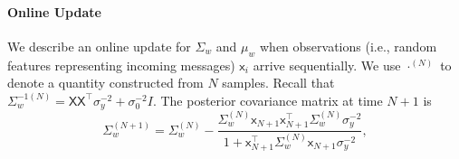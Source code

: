 \documentclass[english]{article}
\theoremstyle{plain}
\theoremstyle{plain}
\begin{document}
 
\paragraph{Online Update}
We describe an online update for $\Sigma_{w}$ and
$\mu_{w}$ when observations (i.e., random features representing incoming 
messages) $\mathsf{x}_i$ arrive sequentially. We use $\cdot^{(N)}$
to denote a quantity constructed from $N$ samples. Recall that $\Sigma_{w}^{-1(N)}= \mathsf{X} \mathsf{X}^{\top}\sigma_{y}^{-2}+\sigma_{0}^{-2}I$.
The posterior covariance matrix at time $N+1$ is
\begin{equation}
\Sigma_{w}^{(N+1)} 
 =
\Sigma_{w}^{(N)}-\frac{\Sigma_{w}^{(N)} \mathsf{x}_{N+1} \mathsf{x}_{N+1}^{\top} \Sigma_{w}^{(N)}\sigma_{y}^{-2}}{1+ \mathsf{x}_{N+1}^{\top}\Sigma_{w}^{(N)} \mathsf{x}_{N+1}\sigma_{y}^{-2}},
\end{equation}
\end{document}
